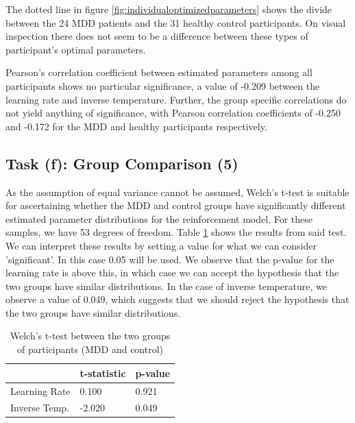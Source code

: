 \documentclass{article}
\begin{document}
The dotted line in figure \ref{fig:individualoptimizedparameters} shows the divide between the 24 MDD patients and the 31 healthy control participants. On visual inspection there does not seem to be a difference between these types of participant's optimal parameters.

Pearson's correlation coefficient between estimated parameters among all participants shows no particular significance, a value of -0.209 between the learning rate and inverse temperature. Further, the group specific correlations do not yield anything of significance, with Pearson correlation coefficients of -0.250 and -0.172 for the MDD and healthy participants respectively.


\subsection{Task (f): Group Comparison (5)}

As the assumption of equal variance cannot be assumed, Welch's t-test is suitable for ascertaining whether the MDD and control groups have significantly different estimated parameter distributions for the reinforcement model. For these samples, we have 53 degrees of freedom. Table \ref{table:ttest} shows the results from said test. We can interpret these results by setting a value for what we can consider 'significant'. In this case 0.05 will be used. We observe that the p-value for the learning rate is above this, in which case we can accept the hypothesis that the two groups have similar distributions. In the case of inverse temperature, we observe a value of 0.049, which suggests that we should reject the hypothesis that the two groups have similar distributions. 


\begin{table}[H]
\begin{tabular}{@{}lll@{}}
  \toprule
              & t-statistic & p-value \\ \midrule
Learning Rate & 0.100       & 0.921   \\
Inverse Temp. & -2.020      & 0.049   \\ \bottomrule
\end{tabular}
\caption{Welch's t-test between the two groups of participants (MDD and control)}
\label{table:ttest}
\end{table}


\printbibliography
\end{document}
